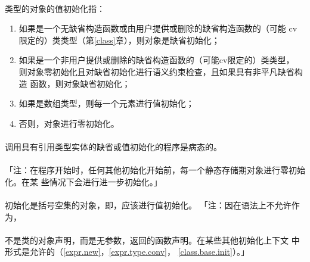 \paragraph{}
类型的对象的值初始化指：
\begin{enumerate}
  \item{如果是一个无缺省构造函数或由用户提供或删除的缺省构造函数的（可能
    cv限定的）类类型（第\ref{class}章），则对象是缺省初始化；}
  \item{如果是一个非用户提供或删除的缺省构造函数的（可能cv限定的）类类型，
    则对象零初始化且对缺省初始化进行语义约束检查，且如果具有非平凡缺省构造
    函数，则对象缺省初始化；}
  \item{如果是数组类型，则每一个元素进行值初始化；}
  \item{否则，对象进行零初始化。}
\end{enumerate}

\paragraph{}
调用具有引用类型实体的缺省或值初始化的程序是病态的。

\paragraph{}
「注：在程序开始时，任何其他初始化开始前，每一个静态存储期对象进行零初始化。在某
些情况下会进行进一步初始化。」

\paragraph{}
初始化是括号空集的对象，即\tm{()}，应该进行值初始化。
「注：因\tm{()}在语法上不允许作为，                           \\
\mbox{\qquad{}}                                                      \\
不是类的对象声明，而是无参数，返回的函数声明。在某些其他初始化上下文
中形式\tm{()}是允许的（\ref{expr.new}，\ref{expr.type.conv}，
\ref{class.base.init}）。」

